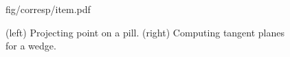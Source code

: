 \begin{figure}[t]
\centering
\begin{overpic} 
[width=\linewidth]
{fig/corresp/item.pdf}
\end{overpic}
\caption{(left) Projecting point on a pill. (right) Computing tangent planes for a wedge. }
\label{fig:corresp}
\end{figure}